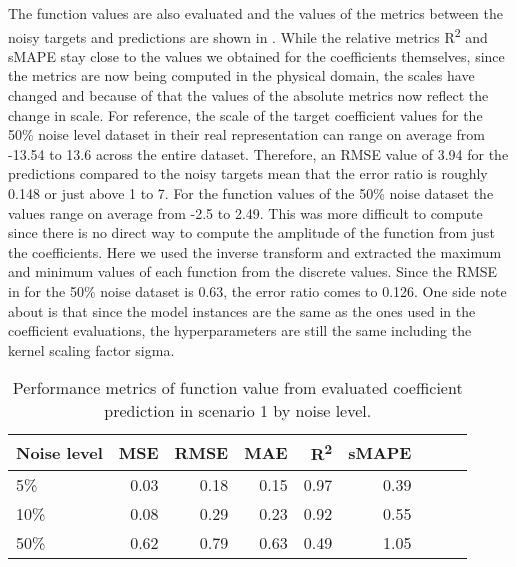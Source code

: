The function values are also evaluated and the values of the metrics between the noisy targets and predictions are shown in . While the relative metrics R\textsuperscript{2} and sMAPE stay close to the values we obtained for the coefficients themselves, since the metrics are now being computed in the physical domain, the scales have changed and because of that the values of the absolute metrics now reflect the change in scale. For reference, the scale of the target coefficient values for the 50\% noise level dataset in their real representation can range on average from -13.54 to 13.6 across the entire dataset. Therefore, an RMSE value of 3.94 for the predictions compared to the noisy targets mean that the error ratio is roughly 0.148 or just above 1 to 7. For the function values of the 50\% noise dataset the values range on average from -2.5 to 2.49. This was more difficult to compute since there is no direct way to compute the amplitude of the function from just the coefficients. Here we used the inverse transform and extracted the maximum and minimum values of each function from the discrete values. Since the RMSE in  for the 50\% noise dataset is 0.63, the error ratio comes to 0.126. One side note about  is that since the model instances are the same as the ones used in the coefficient evaluations, the hyperparameters are still the same including the kernel scaling factor sigma.
\begin{table}[H]
  \caption{Performance metrics of function value from evaluated coefficient prediction in scenario 1 by noise level.}\label{table:scenario_1_function_metrics}
  \centering
  \begin{tabular}{lrrrrrrrr}
    \toprule
    Noise level & MSE  & RMSE & MAE  & R\textsuperscript{2} & sMAPE \\
    \midrule
    5\%         & 0.03 & 0.18 & 0.15 & 0.97                 & 0.39  \\
    10\%        & 0.08 & 0.29 & 0.23 & 0.92                 & 0.55  \\
    50\%        & 0.62 & 0.79 & 0.63 & 0.49                 & 1.05  \\
    \bottomrule
  \end{tabular}
\end{table}

